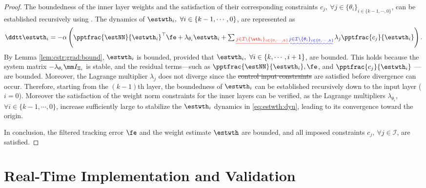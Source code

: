 \documentclass[letterpaper, journal]{IEEEtran}
\providecommand{\DIFadd}[1]{{\protect\color{blue}\uwave{#1}}} %
\providecommand{\DIFdel}[1]{{\protect\color{red}\sout{#1}}} %
\providecommand{\DIFaddbegin}{} %
\providecommand{\DIFaddend}{} %
\providecommand{\DIFdelbegin}{} %
\providecommand{\DIFdelend}{} %
\begin{document}
\begin{proof}
\hfill 

The boundedness of the inner layer weights and the satisfaction of their corresponding constraints $c_j,\ \forall j\in\{\theta_i\}_{i\in\{k-1,\cdots,0\}}$, can be established recursively using \cite[Chap.~4, Thm.~1.9]{Desoer:2009aa}.
The dynamics of $\estwth_i,\ \forall i\in\{k-1,\cdots,0\}$, are represented as
\begin{equation}
    \ddtt \estwth_i 
    =
    -\alpha
    \left(
        \pptfrac{\estNN}{\estwth_i}^\top
        \fe
        +
        \lambda_{\theta_i}\estwth_i
        +
        \textstyle\sum\DIFdelbegin \DIFdel{_{
            j\in\mathcal{I}\setminus \{\wth_i\}_{i\in\{0,\cdots,k\}}
        }
        }\DIFdelend \DIFaddbegin \DIFadd{_{
            j\in\mathcal{I}\setminus \{\theta_i\}_{i\in\{0,\cdots,k\}}
        }
        }\DIFaddend \lambda_j
        \pptfrac{c_j}{\estwth_i}
    \right)
    .
    \label{eq:estwth:dyn}
\end{equation}
By Lemma \ref{lem:cstr:grad:bound}, $\estwth_i$ is bounded, provided that $\estwth_i,\ \forall i\in\{k,\cdots,i+1\}$, are bounded. 
This holds because the system matrix $-\lambda_{\theta_i} \mm I_{\Xi_i}$ is stable, and the residual terms—such as $\pptfrac{\estNN}{\estwth_i}, \fe$, and $\pptfrac{c_j}{\estwth_i}$ —are bounded.
Moreover, the Lagrange multiplier $\lambda_j$ does not diverge since the \DIFdelbegin \DIFdel{control input constraints }\DIFdelend \DIFaddbegin \DIFadd{input constraints $c_j,\ \forall j\in\mathcal{I}\setminus \{\theta_i\}_{i\in\{0,\cdots,k\}}$ }\DIFaddend are satisfied before divergence can occur.
Therefore, starting from the $(k-1)$th layer, the boundedness of $\estwth_i$ can be established recursively down to the input layer ($i=0$).
Moreover the satisfaction of the weight norm constraints for the inner layers can be verified, as the Lagrange multipliers $\lambda_{\theta_i}$, $\forall i\in\{k-1,\cdots,0\}$, increase sufficiently large to stabilize the $\estwth_i$ dynamics in \eqref{eq:estwth:dyn}, leading to its convergence toward the origin.

\hfill

In conclusion, the filtered tracking error $\fe$ and the weight estimate $\estwth$ are bounded, and all imposed constraints $c_j,\ \forall j\in\mathcal I$, are satisfied.

\end{proof}

\section{Real-Time Implementation and Validation}\label{sec:sim}
\end{document}
